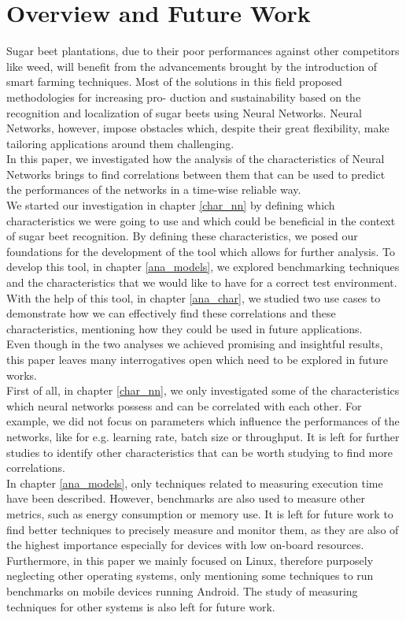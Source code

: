 \chapter{Overview and Future Work}

Sugar beet plantations, due to their poor performances against other competitors like weed, will benefit from the advancements brought by the introduction of smart farming techniques. Most of the solutions in this field proposed methodologies for increasing pro- duction and sustainability based on the recognition and localization of sugar beets using Neural Networks. Neural Networks, however, impose obstacles which, despite their great flexibility, make tailoring applications around them challenging.\\
In this paper, we investigated how the analysis of the characteristics of Neural Networks brings to find correlations between them that can be used to predict the performances of the networks in a time-wise reliable way.\\
We started our investigation in chapter \ref{char_nn} by defining which characteristics we were going to use and which could be beneficial in the context of sugar beet recognition. By defining these characteristics, we posed our foundations for the development of the tool which allows for further analysis. To develop this tool, in chapter \ref{ana_models}, we explored benchmarking techniques and the characteristics that we would like to have for a correct test environment. With the help of this tool, in chapter \ref{ana_char},  we studied two use cases to demonstrate how we can effectively find these correlations and these characteristics, mentioning how they could be used in future applications. \\
Even though in the two analyses we achieved promising and insightful results, this paper leaves many interrogatives open which need to be explored in future works. \\
First of all, in chapter \ref{char_nn}, we only investigated some of the characteristics which neural networks possess and can be correlated with each other. For example, we did not focus on parameters which influence the performances of the networks, like for e.g. learning rate, batch size or throughput. It is left for further studies to identify other characteristics that can be worth studying to find more correlations.\\
In chapter \ref{ana_models}, only techniques related to measuring execution time have been described. However, benchmarks are also used to measure other metrics, such as energy consumption or memory use. It is left for future work to find better techniques to precisely measure and monitor them, as they are also of the highest importance especially for devices with low on-board resources. Furthermore, in this paper we mainly focused on Linux, therefore purposely neglecting other operating systems, only mentioning some techniques to run benchmarks on mobile devices running Android. The study of measuring techniques for other systems is also left for future work. \\
